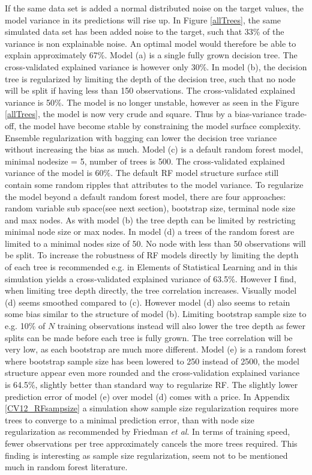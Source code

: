 If the same data set is added a normal distributed noise on the target values, the model variance in its predictions will rise up. In Figure \ref{allTrees}, the same simulated data set has been added noise to the target, such that 33\% of the variance is non explainable noise. An optimal model would therefore be able to explain approximately 67\%. Model (a) is a single fully grown decision tree. The cross-validated explained variance is however only 30\%. In model (b), the decision tree is regularized by limiting the depth of the decision tree, such that no node will be split if having less than 150 observations. The cross-validated explained variance is 50\%. The model is no longer unstable, however as seen in the Figure \ref{allTrees}, the model is now very crude and square. Thus by a bias-variance trade-off, the model have become stable by constraining the model surface complexity. Ensemble regularization with bagging can lower the decision tree variance without increasing the bias as much.  Model (c) is a default random forest model, minimal nodesize = 5, number of trees is 500. The cross-validated explained variance of the model is 60\%. The default RF model structure surface still contain some random ripples that attributes to the model variance. To regularize the model beyond a default random forest model, there are four approaches: random variable sub space(see next section), bootstrap size, terminal node size and max nodes. As with model (b) the tree depth can be limited by restricting minimal node size or max nodes. In model (d) a trees of the random forest are limited to a minimal nodes size of 50. No node with less than 50 observations will be split. To increase the robustness of RF models directly by limiting the depth of each tree is recommended e.g. in Elements of Statistical Learning \cite{friedman2001elements} and in this simulation yields a cross-validated explained variance of 63.5\%. However I find, when limiting tree depth directly, the tree correlation increases. Visually model (d) seems smoothed compared to (c). However model (d) also seems to retain some bias similar to the structure of model (b). Limiting bootstrap sample size to e.g. 10\% of $N$ training observations instead will also lower the tree depth as fewer splits can be made before each tree is fully grown. The tree correlation will be very low, as each bootstrap are much more different. Model (e) is a random forest where bootstrap sample size has been lowered to 250 instead of 2500, the model structure appear even more rounded and the cross-validation explained variance is 64.5\%, slightly better than standard way to regularize RF. The slightly lower prediction error of model (e) over model (d) comes with a price. In Appendix \ref{CV12_RFsampsize} a simulation show sample size regularization requires more trees to converge to a minimal prediction error, than with node size regularization as recommended by Friedman \textit{et al}. In terms of training speed, fewer observations per tree approximately cancels the more trees required. This finding is interesting as sample size regularization, seem not to be mentioned much in random forest literature.

